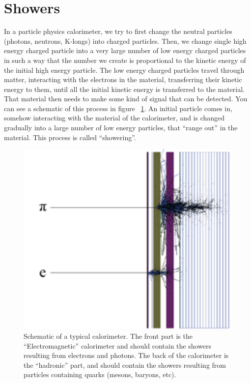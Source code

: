 \;
\;

\section{Showers}

\noindent
In a particle physics calorimeter, we try to first change the neutral particles (photons, neutrons, K-longs) into charged particles. Then, we change single high energy charged particle into a very large number of low energy charged particles in such a way that the number we create is proportional to the kinetic energy of the initial high energy particle. The low energy charged particles travel through matter, interacting with the electrons in the material, transferring their kinetic energy to them, until all the initial kinetic energy is transferred to the material. That material then needs to make some kind of signal that can be detected. You can see a schematic of this process in figure ~\ref{fig:cal1}. An initial particle comes in, somehow interacting with the material of the calorimeter, and is changed gradually into a large number of low energy particles, that ``range out'' in the material. This process is called ``showering''.

\;
\;

\begin{figure}[h]
\centering\includegraphics[scale=1.0]{./calorimetry/Pictures/fig1.pdf}
\caption{Schematic of a typical calorimeter. The front part is the ``Electromagnetic'' calorimeter and should contain the showers resulting from electrons and photons. The back of the calorimeter is the ``hadronic'' part, and should contain the showers resulting from particles containing quarks (mesons, baryons, etc).}
\label{fig:cal1}
\end{figure}

